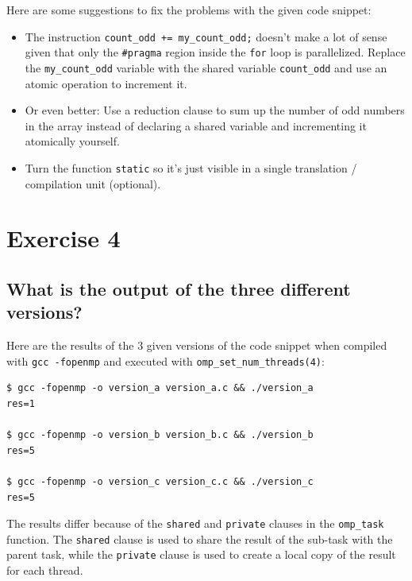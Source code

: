 \documentclass[a4paper,%
7pt,%
DIV12,
headsepline,%
headings=normal,
]{scrartcl}
\begin{document}
Here are some suggestions to fix the problems with the given code snippet:

\begin{itemize}
    \item The instruction \texttt{count\_odd += my\_count\_odd;} doesn't make a lot of sense given that only the \texttt{\#pragma} region inside the \texttt{for} loop is parallelized. Replace the \texttt{my\_count\_odd} variable with the shared variable \texttt{count\_odd} and use an atomic operation to increment it. 

    \item Or even better: Use a reduction clause to sum up the number of odd numbers in the array instead of declaring a shared variable and incrementing it atomically yourself.
    
    \item Turn the function \texttt{static} so it's just visible in a single translation / compilation unit (optional).
\end{itemize}



\section{Exercise 4}

\subsection{What is the output of the three different versions?}

Here are the results of the 3 given versions of the code snippet when compiled with \texttt{gcc -fopenmp} and executed with \texttt{omp\_set\_num\_threads(4)}:

\begin{verbatim}
$ gcc -fopenmp -o version_a version_a.c && ./version_a
res=1

$ gcc -fopenmp -o version_b version_b.c && ./version_b
res=5

$ gcc -fopenmp -o version_c version_c.c && ./version_c
res=5
\end{verbatim}

The results differ because of the \texttt{shared} and \texttt{private} clauses in the \texttt{omp\_task} function. The \texttt{shared} clause is used to share the result of the sub-task with the parent task, while the \texttt{private} clause is used to create a local copy of the result for each thread.
\end{document}
